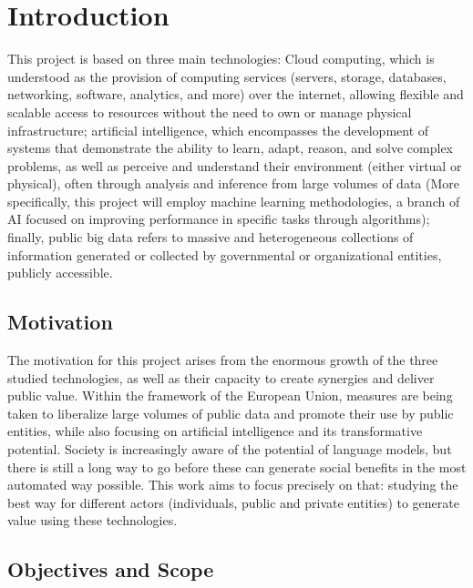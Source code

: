 \chapter{Introduction}
\label{cap:introduction}


\vspace{1cm}

This project is based on three main technologies: Cloud computing, which is understood as the provision of computing services (servers, storage, databases, networking, software, analytics, and more) over the internet, allowing flexible and scalable access to resources without the need to own or manage physical infrastructure; artificial intelligence, which encompasses the development of systems that demonstrate the ability to learn, adapt, reason, and solve complex problems, as well as perceive and understand their environment (either virtual or physical), often through analysis and inference from large volumes of data (More specifically, this project will employ machine learning methodologies, a branch of AI focused on improving performance in specific tasks through algorithms); finally, public big data refers to massive and heterogeneous collections of information generated or collected by governmental or organizational entities, publicly accessible.

\section{Motivation}

The motivation for this project arises from the enormous growth of the three studied technologies, as well as their capacity to create synergies and deliver public value. Within the framework of the European Union, measures are being taken to liberalize large volumes of public data and promote their use by public entities, while also focusing on artificial intelligence and its transformative potential. Society is increasingly aware of the potential of language models, but there is still a long way to go before these can generate social benefits in the most automated way possible. This work aims to focus precisely on that: studying the best way for different actors (individuals, public and private entities) to generate value using these technologies.

\section{Objectives and Scope}

